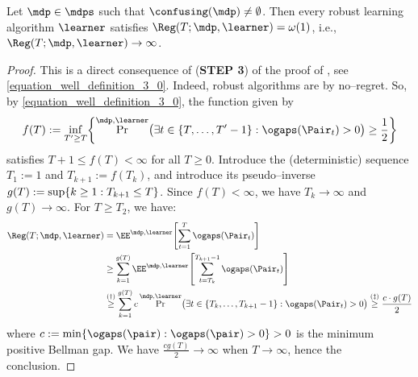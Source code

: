 \documentclass[preprint,cleveref,12pt]{colt2025}
\DeclarePairedDelimiter{\braces}{\{}{\}}	%
\DeclarePairedDelimiter{\brackets}{[}{]}	%
\DeclarePairedDelimiter{\parens}{(}{)}	%
\def\model{\mdp}
\def\models{\mdps}
\begin{document}
    \begin{proposition}
    \label{proposition_confusing_robust}
        Let $\model \in \models$ such that $\confusing(\model) \ne \emptyset$. 
        Then every robust learning algorithm $\learner$ satisfies $\Reg(T; \model, \learner) = \omega(1)$, i.e., $\Reg(T; \model, \learner) \to \infty$. 
    \end{proposition}
    \begin{proof}
        This is a direct consequence of (\textbf{STEP 3}) of the proof of , see \eqref{equation_well_definition_3_0}.
        Indeed, robust algorithms are by no--regret.
        So, by \eqref{equation_well_definition_3_0}, the function given by
        \begin{equation*}
            f(T)
            := 
            \inf_{T' \ge T}
            \braces*{
                \Pr^{\model, \learner} \parens[\big]{
                    \exists t \in \braces{T, \ldots, T'-1}
                    :
                    \ogaps(\Pair_t) > 0
                }
                \ge 
                \frac 12
            }
        \end{equation*}
        satisfies $T + 1 \le f(T) < \infty$ for all $T \ge 0$. 
        Introduce the (deterministic) sequence $T_1 := 1$ and $T_{k+1} := f(T_k)$, and introduce its pseudo--inverse $g(T) := \sup \braces{k \ge 1: T_{k+1} \le T}$. 
        Since $f(T) < \infty$, we have $T_k \to \infty$ and $g(T) \to \infty$.
        For $T \ge T_2$, we have:
        \begin{align*}
            \Reg(T; \model, \learner)
            & =
            \EE^{\model, \learner} \brackets*{
                \sum_{t=1}^T
                \ogaps(\Pair_t)
            }
            \\
            & \ge 
            \sum_{k=1}^{g(T)}
            \EE^{\model, \learner} \brackets*{
                \sum_{t=T_k}^{T_{k+1}-1}
                \ogaps(\Pair_t)
            }
            \\
            & \overset{(\dagger)}\ge 
            \sum_{k=1}^{g(T)} 
            c \Pr^{\model, \learner} \parens[\big]{
                \exists t \in \braces{T_k, \ldots, T_{k+1}-1}
                :
                \ogaps(\Pair_t) > 0
            }
            \overset{(\ddagger)}\ge
            \frac {c \cdot g(T)}2
        \end{align*}
        where $c := \min \braces{\ogaps(\pair): \ogaps(\pair) > 0} > 0$ is the minimum positive Bellman gap.
        We have $\frac {cg(T)}2 \to \infty$ when $T \to \infty$, hence the conclusion.
    \end{proof}
\end{document}

